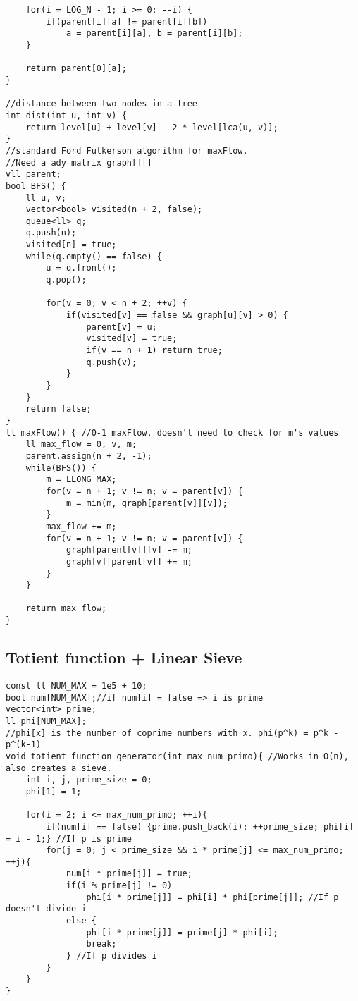 \documentclass[a4paper]{article}
\begin{document}
\begin{verbatim}
    for(i = LOG_N - 1; i >= 0; --i) {
        if(parent[i][a] != parent[i][b])
            a = parent[i][a], b = parent[i][b];
    }
        
    return parent[0][a];
}

//distance between two nodes in a tree
int dist(int u, int v) {
    return level[u] + level[v] - 2 * level[lca(u, v)];
}
//standard Ford Fulkerson algorithm for maxFlow.
//Need a ady matrix graph[][]
vll parent;
bool BFS() {
    ll u, v;
    vector<bool> visited(n + 2, false);
    queue<ll> q;
    q.push(n);
    visited[n] = true;
    while(q.empty() == false) {
        u = q.front();
        q.pop();
        
        for(v = 0; v < n + 2; ++v) {
            if(visited[v] == false && graph[u][v] > 0) {
                parent[v] = u;
                visited[v] = true;
                if(v == n + 1) return true;
                q.push(v);
            }
        }
    }
    return false;
}
ll maxFlow() { //0-1 maxFlow, doesn't need to check for m's values
    ll max_flow = 0, v, m;
    parent.assign(n + 2, -1);
    while(BFS()) {
        m = LLONG_MAX;
        for(v = n + 1; v != n; v = parent[v]) {
            m = min(m, graph[parent[v]][v]);
        }
        max_flow += m;
        for(v = n + 1; v != n; v = parent[v]) {
            graph[parent[v]][v] -= m;
            graph[v][parent[v]] += m;
        }
    }
    
    return max_flow;
}
\end{verbatim}
\subsection*{Totient function + Linear Sieve}
\begin{verbatim}
const ll NUM_MAX = 1e5 + 10;
bool num[NUM_MAX];//if num[i] = false => i is prime
vector<int> prime;
ll phi[NUM_MAX];
//phi[x] is the number of coprime numbers with x. phi(p^k) = p^k - p^(k-1)
void totient_function_generator(int max_num_primo){ //Works in O(n), also creates a sieve.
    int i, j, prime_size = 0;
    phi[1] = 1;
    
    for(i = 2; i <= max_num_primo; ++i){
        if(num[i] == false) {prime.push_back(i); ++prime_size; phi[i] = i - 1;} //If p is prime
        for(j = 0; j < prime_size && i * prime[j] <= max_num_primo; ++j){
            num[i * prime[j]] = true;
            if(i % prime[j] != 0)
                phi[i * prime[j]] = phi[i] * phi[prime[j]]; //If p doesn't divide i
            else {
                phi[i * prime[j]] = prime[j] * phi[i];
                break;
            } //If p divides i
        }
    }
}
\end{verbatim}
\end{document}
